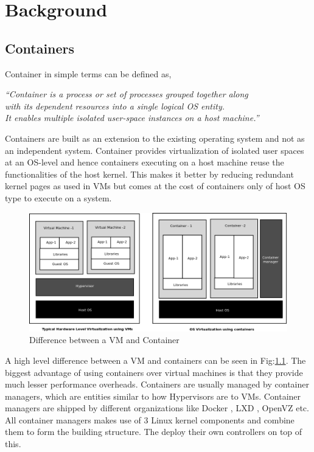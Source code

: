 
\chapter{Background}

  \section{Containers}
  
    Container in simple terms can be defined as, 
  
    \begin{center}
      \textit{``Container is a process or set of processes grouped together along \\ with its dependent resources into a single logical OS 
entity. \\It enables multiple isolated user-space instances on a host machine.''} 
    \end{center}
    
    Containers \cite{manual} are built as an extension to the existing operating system and not as an independent system. Container 
provides virtualization of isolated user spaces at an OS-level and hence containers executing on a host machine reuse the functionalities of 
the host kernel. This makes it better by reducing redundant kernel pages as used in VMs but comes at the cost of containers only of host OS 
type to execute on a system.

     \begin{figure}
      \centering
      \includegraphics[width=1\textwidth]{images/container_vs_vm.png}
      \caption{Difference between a VM and Container}
      \label{img_difference}
    \end{figure}

A high level difference between a VM and containers can be seen in Fig:\ref{img_difference}. The biggest advantage of using containers over 
virtual machines is that they provide much lesser performance overheads. Containers are usually managed by container managers, which are 
entities similar to how Hypervisors are to VMs. Container managers are shipped by different organizations like Docker \cite{docker}, LXD 
\cite{lxd}, OpenVZ \cite{kolyshkin2006virtualization} etc. All container managers makes use of 3 Linux kernel components and combine 
them to form the building structure. The deploy their own controllers on top of this. 
    
